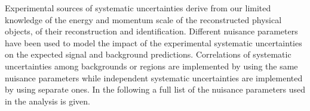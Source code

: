 Experimental sources of systematic uncertainties derive from our limited
knowledge of the energy and momentum scale of the reconstructed physical
objects, of their reconstruction and identification. Different nuisance
parameters have been used to model the impact of the experimental systematic
uncertainties on the expected signal and background predictions. Correlations of
systematic uncertainties among backgrounds or regions are implemented by using
the same nuisance parameters while independent systematic uncertainties are
implemented by using separate ones. In the following a full list of the nuisance
parameters used in the analysis is given.
